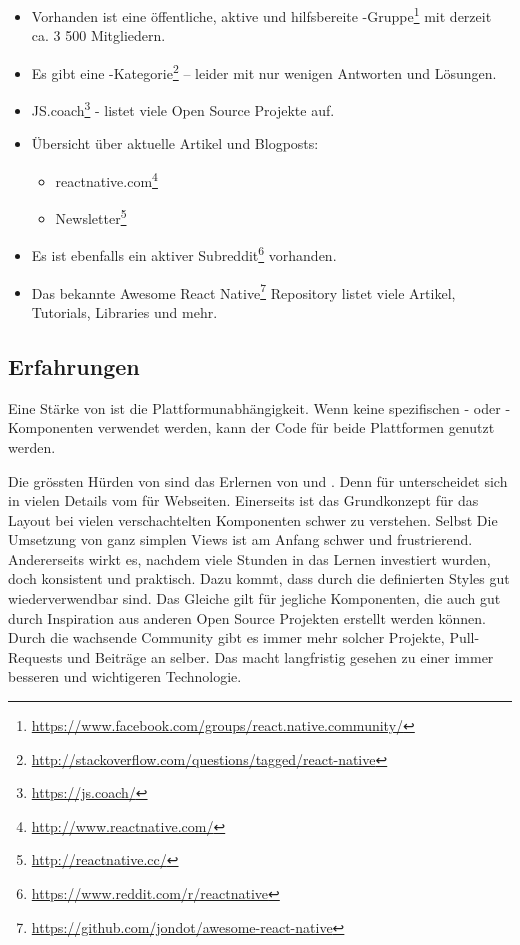 \begin{itemize}
	\item Vorhanden ist eine öffentliche, aktive und hilfsbereite -Gruppe\footnote{\url{https://www.facebook.com/groups/react.native.community/}} mit derzeit ca. 3 500 Mitgliedern.
	\item Es gibt eine -Kategorie\footnote{\url{http://stackoverflow.com/questions/tagged/react-native}} -- leider mit nur wenigen Antworten und Lösungen.
	\item JS.coach\footnote{\url{https://js.coach/}} - listet viele Open Source Projekte auf.
	\item Übersicht über aktuelle Artikel und Blogposts: 
	\begin{itemize}
		\item reactnative.com\footnote{\url{http://www.reactnative.com/}}
		\item {} Newsletter\footnote{\url{http://reactnative.cc/}}
		
	\end{itemize}
	\item Es ist ebenfalls ein aktiver Subreddit\footnote{\url{https://www.reddit.com/r/reactnative}} vorhanden.
	\item Das bekannte Awesome React Native\footnote{\url{https://github.com/jondot/awesome-react-native}}  Repository listet viele Artikel, Tutorials, Libraries und mehr. 
\end{itemize}


\subsection{Erfahrungen}
Eine Stärke von  ist die Plattformunabhängigkeit. 
Wenn keine spezifischen - oder -Komponenten verwendet werden, kann der Code für beide Plattformen genutzt werden.

Die grössten Hürden von  sind das Erlernen von  und . 
Denn  für  unterscheidet sich in vielen Details vom  für Webseiten. 
Einerseits ist das Grundkonzept für das Layout bei vielen verschachtelten Komponenten schwer zu verstehen. 
Selbst Die Umsetzung von ganz simplen Views ist am Anfang schwer und frustrierend. 
Andererseits wirkt es, nachdem viele Stunden in das Lernen investiert wurden, doch konsistent und praktisch. 
Dazu kommt, dass durch  die definierten Styles gut wiederverwendbar sind. 
Das Gleiche gilt für jegliche Komponenten, die auch gut durch Inspiration aus anderen Open Source Projekten erstellt werden können.
Durch die wachsende Community gibt es immer mehr solcher Projekte, Pull-Requests und Beiträge an  selber. 
Das macht  langfristig gesehen zu einer immer besseren und wichtigeren Technologie. 

